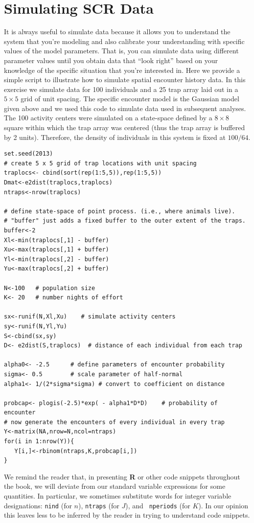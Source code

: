 \section{Simulating SCR Data}
\label{scr0.sec.simulating}

It is always useful to simulate data because it allows you to
understand the system that you're modeling and also calibrate your
understanding with specific values of the model parameters.
That is, you can
simulate data using different parameter values until you obtain data
that ``look right'' based on your knowledge of the specific situation
that you're interested in. Here we provide a simple script to
illustrate how to simulate spatial encounter history data. In this
exercise we simulate data for 100 individuals and a 25 trap array laid
out in a $5 \times 5$ grid of unit spacing.  The specific encounter
model is the Gaussian model given above and we used this code to
simulate data used in subsequent analyses.  The 100 activity centers
were simulated on a state-space defined by a $8 \times 8$ square
within which the trap array was centered (thus the trap array is
buffered by 2 units). Therefore, the density of individuals in this
system is fixed at $100/64$.

{\small
\begin{verbatim}
set.seed(2013)
# create 5 x 5 grid of trap locations with unit spacing
traplocs<- cbind(sort(rep(1:5,5)),rep(1:5,5))
Dmat<-e2dist(traplocs,traplocs)
ntraps<-nrow(traplocs)

# define state-space of point process. (i.e., where animals live).
# "buffer" just adds a fixed buffer to the outer extent of the traps.
buffer<-2
Xl<-min(traplocs[,1] - buffer)
Xu<-max(traplocs[,1] + buffer)
Yl<-min(traplocs[,2] - buffer)
Yu<-max(traplocs[,2] + buffer)

N<-100   # population size
K<- 20   # number nights of effort

sx<-runif(N,Xl,Xu)    # simulate activity centers
sy<-runif(N,Yl,Yu)
S<-cbind(sx,sy)
D<- e2dist(S,traplocs)  # distance of each individual from each trap

alpha0<- -2.5      # define parameters of encounter probability
sigma<- 0.5        # scale parameter of half-normal
alpha1<- 1/(2*sigma*sigma) # convert to coefficient on distance

probcap<- plogis(-2.5)*exp( - alpha1*D*D)    # probability of encounter
# now generate the encounters of every individual in every trap
Y<-matrix(NA,nrow=N,ncol=ntraps)
for(i in 1:nrow(Y)){
   Y[i,]<-rbinom(ntraps,K,probcap[i,])
}
\end{verbatim}
}
We remind the reader that, in presenting {\bf R} or other code snippets
throughout the book, we will deviate from our standard variable
expressions for some quantities.
In particular, we sometimes
substitute words for integer variable designations:
\mbox{\tt nind} (for $n$), \mbox{\tt ntraps} (for $J$), and \mbox{\tt
 nperiods} (for $K$). In our opinion this leaves less to be inferred
by the reader in trying to understand code snippets.

